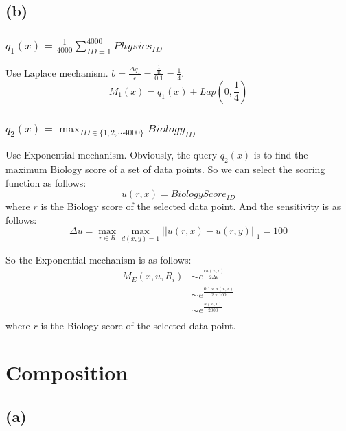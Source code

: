 \documentclass[a4paper,12pt]{article}
\begin{document}
\subsection{(b)}
\subsubsection{$q_1(x) = \frac{1}{4000}\sum_{ID=1}^{4000}Physics_{ID}$}
Use Laplace mechanism. $b = \frac{\Delta q_1}{\epsilon} = \frac{\frac{1}{40}}{0.1} = \frac{1}{4}$.
\begin{equation}
    M_1(x) = q_1(x) + Lap(0, \frac{1}{4})
\end{equation}

\subsubsection{$q_2(x) = \max_{ID\in \{1,2,\cdots 4000\}}Biology_{ID}$}
Use Exponential mechanism. Obviously, the query $q_2(x)$ is to find the maximum Biology score of a set of data points. So we can select the scoring function as follows:
\begin{equation}
    u(r, x) = BiologyScore_{ID}
\end{equation}
where $r$ is the Biology score of the selected data point. And the sensitivity is as follows:
\begin{equation}
    \Delta u =\max_{r \in R} \max_{d(x,y) = 1}||u(r,x) - u(r,y)||_1 = 100
\end{equation}

So the Exponential mechanism is as follows:
\begin{equation}
    \begin{aligned}
        M_E(x, u, R_i) & \sim e^{\frac{\epsilon u(x, r)}{2\Delta u}}    \\
                       & \sim e^{\frac{0.1\times u(x, r)}{2\times 100}} \\
                       & \sim e^{\frac{u(x, r)}{2000}}                  \\
    \end{aligned}
\end{equation}
where $r$ is the Biology score of the selected data point.
\section{Composition}
\subsection{(a)}
\end{document}
